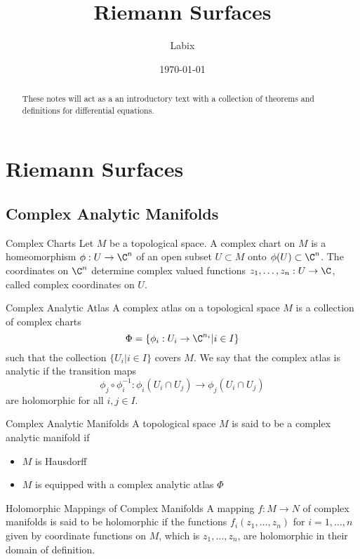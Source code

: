 \documentclass[a4paper]{article}
\title{Riemann Surfaces}
\author{Labix}
\date{\today}
\begin{document}
\maketitle
\begin{abstract}
These notes will act as a an introductory text with a collection of theorems and definitions for differential equations. 
\end{abstract}
\tableofcontents
\pagebreak

\section{Riemann Surfaces}
\subsection{Complex Analytic Manifolds}
\begin{defn}{Complex Charts}{} Let $M$ be a topological space. A complex chart on $M$ is a homeomorphism $\phi:U\to\C^n$ of an open subset $U\subset M$ onto $\phi(U)\subset\C^n$. The coordinates on $\C^n$ determine complex valued functions $z_1,\dots,z_n:U\to\C$, called complex coordinates on $U$. 
\end{defn}

\begin{defn}{Complex Analytic Atlas}{} A complex atlas on a topological space $M$ is a collection of complex charts $$\Phi=\{\phi_i:U_i\to\C^{n_i}|i\in I\}$$ such that the collection $\{U_i|i\in I\}$ covers $M$. We say that the complex atlas is analytic if the transition maps $$\phi_j\circ\phi_i^{-1}:\phi_i(U_i\cap U_j)\to\phi_j(U_i\cap U_j)$$ are holomorphic for all $i,j\in I$. 
\end{defn}

\begin{defn}{Complex Analytic Manifolds}{} A topological space $M$ is said to be a complex analytic manifold if 
\begin{itemize}
\item $M$ is Hausdorff
\item $M$ is equipped with a complex analytic atlas $\Phi$
\end{itemize}
\end{defn}

\begin{defn}{Holomorphic Mappings of Complex Manifolds}{} A mapping $f:M\to N$ of complex manifolds is said to be holomorphic if the functions $f_i(z_1,\dots,z_n)$ for $i=1,\dots,n$ given by coordinate functions on $M$, which is $z_1,\dots,z_n$, are holomorphic in their domain of definition. 
\end{defn}
\end{document}
